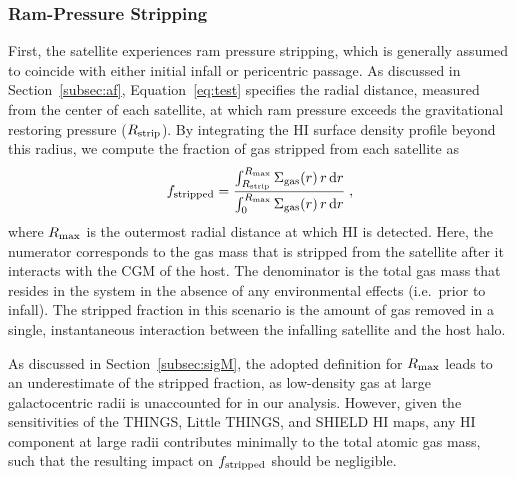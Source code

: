 \subsubsection{Ram-Pressure Stripping}
First, the satellite experiences ram pressure stripping, which is
generally assumed to coincide with either initial infall or pericentric
passage. As discussed in Section~\ref{subsec:af},
Equation~\ref{eq:test} specifies the radial distance, measured from
the center of each satellite, at which ram pressure exceeds the
gravitational restoring pressure ($R_{\rm strip}$).
%
By integrating the H{\scriptsize I} surface density profile beyond
this radius, we compute the fraction of gas stripped from each
satellite as
%
\begin{equation}
f_{\rm stripped} = \frac{\int_{R_{\rm strip}}^{R_{\rm max}} \Sigma_{\rm gas}(r)\,
  r\, {\rm d}r}{\int_{0}^{R_{\rm max}} \Sigma_{\rm gas}(r)\, r\, {\rm d}r}  \; ,
\label{eq:frac}
\end{equation}
%
where $R_{\rm max}$ is the outermost radial distance at which
H{\scriptsize I} is detected.
%
Here, the numerator corresponds to the gas mass that is stripped from
the satellite after it interacts with the CGM of the host. The
denominator is the total gas mass that resides in the system in the
absence of any environmental effects (i.e.~prior to infall).
%
The stripped fraction in this scenario is the amount of gas removed in
a single, instantaneous interaction between the infalling satellite
and the host halo.



As discussed in Section~\ref{subsec:sigM}, the adopted definition for
$R_{\rm max}$ leads to an underestimate of the stripped fraction, as
low-density gas at large galactocentric radii is unaccounted for in
our analysis. However, given the sensitivities of the THINGS, Little
THINGS, and SHIELD H{\scriptsize I} maps, any H{\scriptsize I}
component at large radii contributes minimally to the total atomic gas
mass, such that the resulting impact on $f_{\rm stripped}$ should be
negligible.



